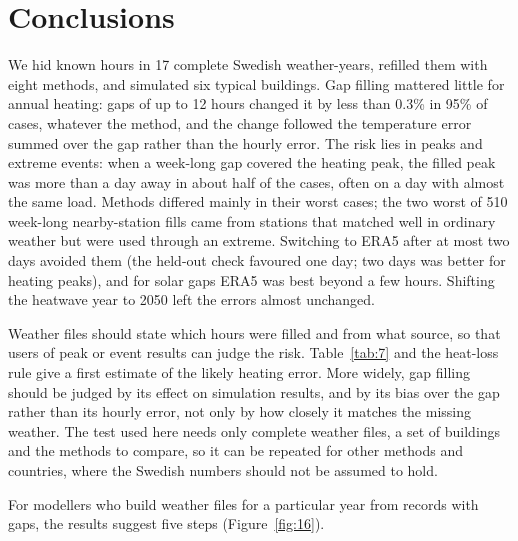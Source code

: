 \section{Conclusions}\label{sec:7}

We hid known hours in 17 complete Swedish weather-years, refilled them with eight methods, and simulated six typical buildings. Gap filling mattered little for annual heating: gaps of up to 12 hours changed it by less than 0.3\% in 95\% of cases, whatever the method, and the change followed the temperature error summed over the gap rather than the hourly error. The risk lies in peaks and extreme events: when a week-long gap covered the heating peak, the filled peak was more than a day away in about half of the cases, often on a day with almost the same load. Methods differed mainly in their worst cases; the two worst of 510 week-long nearby-station fills came from stations that matched well in ordinary weather but were used through an extreme. Switching to ERA5 after at most two days avoided them (the held-out check favoured one day; two days was better for heating peaks), and for solar gaps ERA5 was best beyond a few hours. Shifting the heatwave year to 2050 left the errors almost unchanged.

Weather files should state which hours were filled and from what source, so that users of peak or event results can judge the risk. Table~\ref{tab:7} and the heat-loss rule give a first estimate of the likely heating error. More widely, gap filling should be judged by its effect on simulation results, and by its bias over the gap rather than its hourly error, not only by how closely it matches the missing weather. The test used here needs only complete weather files, a set of buildings and the methods to compare, so it can be repeated for other methods and countries, where the Swedish numbers should not be assumed to hold.

For modellers who build weather files for a particular year from records with gaps, the results suggest five steps (Figure~\ref{fig:16}).

